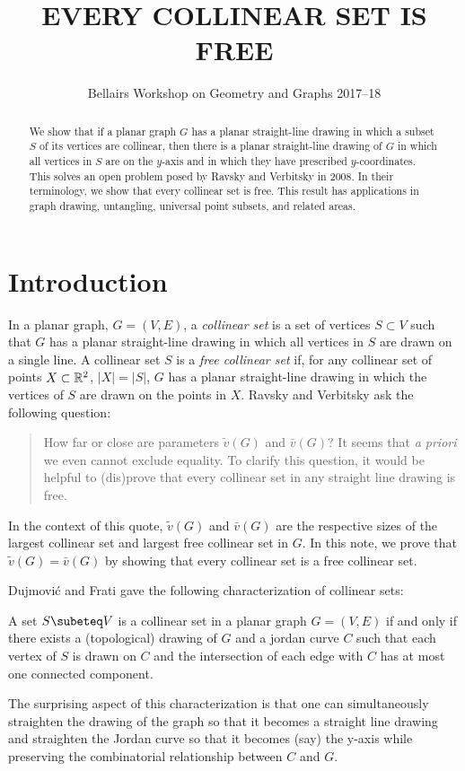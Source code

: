 \documentclass{patmorin}
\title{\MakeUppercase{Every Collinear Set is Free}}
\author{Bellairs Workshop on Geometry and Graphs 2017--18}
\begin{document}
\maketitle


\begin{abstract}
  We show that if a planar graph $G$ has a planar straight-line drawing
  in which a subset $S$ of its vertices are collinear, then there is a
  planar straight-line drawing of $G$ in which all vertices in $S$ are
  on the $y$-axis and in which they have prescribed $y$-coordinates.
  This solves an open problem posed by Ravsky and Verbitsky in 2008.
  In their terminology, we show that every collinear set is free.
  This result has applications in graph drawing, untangling, universal
  point subsets, and related areas.
\end{abstract}


\section{Introduction}

In a planar graph, $G=(V,E)$, a \emph{collinear set} is a set of vertices
$S\subset V$ such that $G$ has a planar straight-line drawing in which
all vertices in $S$ are drawn on a single line.  A collinear set $S$
is a \emph{free collinear set} if, for any collinear set of points
$X\subset\mathbb{R}^2$, $|X|=|S|$, $G$ has a planar straight-line drawing in
which the vertices of $S$ are drawn on the points in $X$.  Ravsky and
Verbitsky \cite{ravsky.verbitsky:on} ask the following question:

\begin{quote}
   How far or close are parameters $\tilde{v}(G)$ and $\bar{v}(G)$? It
   seems that \emph{a priori} we even cannot exclude equality. To clarify
   this question, it would be helpful to (dis)prove that every collinear
   set in any straight line drawing is free.
\end{quote}

In the context of this quote, $\tilde{v}(G)$ and $\bar{v}(G)$ are the
respective sizes of the largest collinear set and largest free collinear
set in $G$.  In this note, we prove that $\tilde{v}(G)=\bar{v}(G)$ by
showing that every collinear set is a free collinear set.  

Dujmovi\'c and Frati gave the following characterization of collinear sets:
\begin{thm}
   A set $S\subeteq V$ is a collinear set in a planar graph $G=(V,E)$
   if and only if there exists a (topological) drawing of $G$ and a
   jordan curve $C$ such that each vertex of $S$ is drawn on $C$ and the
   intersection of each edge with $C$ has at most one connected component.
\end{thm}
The surprising aspect of this characterization is that one can
simultaneously straighten the drawing of the graph so that it becomes a
straight line drawing and straighten the Jordan curve so that it becomes
(say) the y-axis while preserving the combinatorial relationship between
$C$ and $G$.
\end{document}
